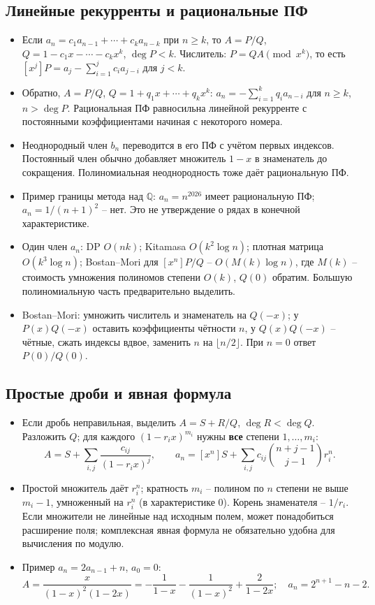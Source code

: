 \subsection{Линейные рекурренты и рациональные ПФ}
\begin{itemize}[leftmargin=*, nosep]
\item Если $a_n=c_1a_{n-1}+\cdots+c_ka_{n-k}$ при $n\ge k$, то $A=P/Q$, $Q=1-c_1x-\cdots-c_kx^k$, $\deg P<k$. Числитель: $P=QA\pmod{x^k}$, то есть $[x^j]P=a_j-\sum_{i=1}^jc_ia_{j-i}$ для $j<k$.
\item Обратно, $A=P/Q$, $Q=1+q_1x+\cdots+q_kx^k$: $a_n=-\sum_{i=1}^kq_ia_{n-i}$ для $n\ge k$, $n>\deg P$. Рациональная ПФ равносильна линейной рекурренте с постоянными коэффициентами начиная с некоторого номера.
\item Неоднородный член $b_n$ переводится в его ПФ с учётом первых индексов. Постоянный член обычно добавляет множитель $1-x$ в знаменатель до сокращения. Полиномиальная неоднородность тоже даёт рациональную ПФ.
\item Пример границы метода над $\mathbb Q$: $a_n=n^{2026}$ имеет рациональную ПФ; $a_n=1/(n+1)^2$ -- нет. Это не утверждение о рядах в конечной характеристике.
\item Один член $a_n$: DP $O(nk)$; Kitamasa $O(k^2\log n)$; плотная матрица $O(k^3\log n)$; Bostan--Mori для $[x^n]P/Q$ -- $O(M(k)\log n)$, где $M(k)$ -- стоимость умножения полиномов степени $O(k)$, $Q(0)$ обратим. Большую полиномиальную часть предварительно выделить.
\item Bostan--Mori: умножить числитель и знаменатель на $Q(-x)$; у $P(x)Q(-x)$ оставить коэффициенты чётности $n$, у $Q(x)Q(-x)$ -- чётные, сжать индексы вдвое, заменить $n$ на $\lfloor n/2\rfloor$. При $n=0$ ответ $P(0)/Q(0)$.
\end{itemize}

\subsection{Простые дроби и явная формула}
\begin{itemize}[leftmargin=*, nosep]
\item Если дробь неправильная, выделить $A=S+R/Q$, $\deg R<\deg Q$. Разложить $Q$; для каждого $(1-r_ix)^{m_i}$ нужны \textbf{все} степени $1,\ldots,m_i$:
\[
A=S+\sum_{i,j}\frac{c_{ij}}{(1-r_ix)^j},\qquad
 a_n=[x^n]S+\sum_{i,j}c_{ij}\binom{n+j-1}{j-1}r_i^n.
\]
\item Простой множитель даёт $r_i^n$; кратность $m_i$ -- полином по $n$ степени не выше $m_i-1$, умноженный на $r_i^n$ (в характеристике 0). Корень знаменателя -- $1/r_i$. Если множители не линейные над исходным полем, может понадобиться расширение поля; комплексная явная формула не обязательно удобна для вычисления по модулю.
\item Пример $a_n=2a_{n-1}+n$, $a_0=0$:
\[
 A=\frac{x}{(1-x)^2(1-2x)}
 =-\frac1{1-x}-\frac1{(1-x)^2}+\frac2{1-2x};\quad
 a_n=2^{n+1}-n-2.
\]
\end{itemize}

